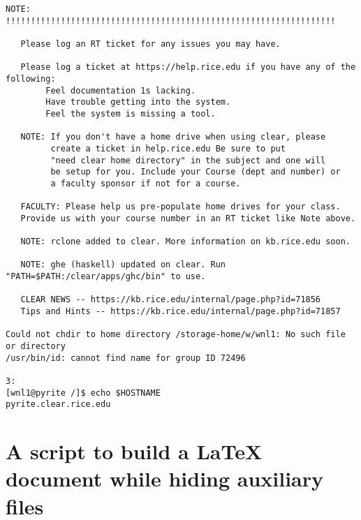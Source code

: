 \documentclass{article}
\begin{document}
\begin{verbatim}
NOTE: !!!!!!!!!!!!!!!!!!!!!!!!!!!!!!!!!!!!!!!!!!!!!!!!!!!!!!!!!!!!!!!!!!

   Please log an RT ticket for any issues you may have.

   Please log a ticket at https://help.rice.edu if you have any of the following:
        Feel documentation 1s lacking.
        Have trouble getting into the system.
        Feel the system is missing a tool.

   NOTE: If you don't have a home drive when using clear, please
         create a ticket in help.rice.edu Be sure to put
         "need clear home directory" in the subject and one will
         be setup for you. Include your Course (dept and number) or
         a faculty sponsor if not for a course.

   FACULTY: Please help us pre-populate home drives for your class.
   Provide us with your course number in an RT ticket like Note above.

   NOTE: rclone added to clear. More information on kb.rice.edu soon.

   NOTE: ghe (haskell) updated on clear. Run "PATH=$PATH:/clear/apps/ghc/bin" to use.

   CLEAR NEWS -- https://kb.rice.edu/internal/page.php?id=71856
   Tips and Hints -- https://kb.rice.edu/internal/page.php?id=71857

Could not chdir to home directory /storage-home/w/wnl1: No such file or directory
/usr/bin/id: cannot find name for group ID 72496

3:
[wnl1@pyrite /]$ echo $HOSTNAME
pyrite.clear.rice.edu
\end{verbatim}

\section{A script to build a LaTeX document while hiding auxiliary files}
\end{document}
